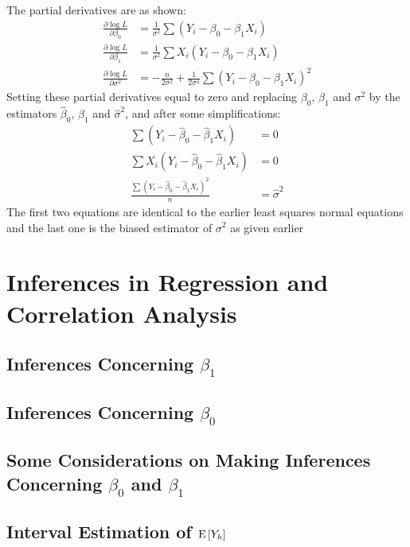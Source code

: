 \begin{itemize}
The partial derivatives are as shown: $$ \begin{aligned} \frac{\partial \log L}{\partial \beta_0} &= \frac{1}{\sigma^2} \sum (Y_i - \beta_0 - \beta_1X_i) \\ \frac{\partial \log L}{\partial \beta_1} &= \frac{1}{\sigma^2} \sum X_i(Y_i - \beta_0 - \beta_1X_i) \\ \frac{\partial \log L}{\partial \sigma^2} &= -\frac{n}{2\sigma^2} + \frac{1}{2\sigma^4}\sum (Y_i - \beta_0 - \beta_1X_i)^2 \end{aligned} $$  Setting these partial derivatives equal to zero and replacing $\beta_0$, $\beta_1$ and $\sigma^2$ by the estimators $\hat{\beta}_0$, $\hat{\beta}_1$ and $\hat{\sigma}^2$, and after some simplifications: $$ \begin{aligned} \sum (Y_i - \hat{\beta}_0 - \hat{\beta}_1X_i) &= 0 \\ \sum X_i(Y_i - \hat{\beta}_0 - \hat{\beta}_1X_i) &= 0 \\ \frac{\sum (Y_i - \hat{\beta}_0 - \hat{\beta}_1X_i)^2}{n} &= \hat{\sigma}^2 \end{aligned} $$ 
The first two equations are identical to the earlier least squares normal equations and the last one is the biased estimator of $\sigma^2$ as given earlier
\end{itemize}


\section{Inferences in Regression and Correlation Analysis}
\subsection{Inferences Concerning $\beta_1$}

\subsection{Inferences Concerning $\beta_0$}

\subsection{Some Considerations on Making Inferences Concerning $\beta_0$ and $\beta_1$}

\subsection{Interval Estimation of $\mathrm{E}\left[ Y_h \right]$}

